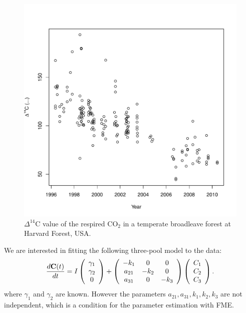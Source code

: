 \documentclass[a4paper]{article}\usepackage[]{graphicx}\usepackage[]{color}
\makeatletter
\def\maxwidth{ %
  \ifdim\Gin@nat@width>\linewidth
    \linewidth
  \else
    \Gin@nat@width
  \fi
}
\newenvironment{kframe}{%
 \def\at@end@of@kframe{}%
 \ifinner\ifhmode%
  \def\at@end@of@kframe{\end{minipage}}%
  \begin{minipage}{\columnwidth}%
 \fi\fi%
 \def\FrameCommand##1{\hskip\@totalleftmargin \hskip-\fboxsep
 \colorbox{shadecolor}{##1}\hskip-\fboxsep
     \hskip-\linewidth \hskip-\@totalleftmargin \hskip\columnwidth}%
 \MakeFramed {\advance\hsize-\width
   \@totalleftmargin\z@ \linewidth\hsize
   \@setminipage}}%
 {\par\unskip\endMakeFramed%
 \at@end@of@kframe}
\newenvironment{knitrout}{}{} %
\makeatother
\begin{document}
\begin{figure}
\begin{knitrout}
\begin{kframe}
{\ttfamily\noindent\color{warningcolor}{\#\# Warning in title(...): conversion failure on '(‰)' in 'mbcsToSbcs': dot substituted for <b0>}}\end{kframe}
\includegraphics[width=\maxwidth]{figure/unnamed-chunk-16-1} 

\end{knitrout}
  \caption{$\Delta^{14}$C value of the respired CO$_2$ in a temperate broadleave forest at Harvard Forest, USA.}
  \label{fig:radiocarbondata}
\end{figure}

We are interested in fitting the following three-pool model to the data: 
\begin{equation} \label{eq:HarvardForestModel}
\frac{d {\bf C}(t)}{dt} = I \left( \begin{array}{c} \gamma_1 \\ \gamma_2 \\ 0 \end{array} \right) +
\left( \begin{array}{ccc}
-k_1 & 0 & 0 \\
a_{21} & -k_2 & 0 \\
a_{31} & 0 & -k_3
\end{array} \right)
\left( \begin{array}{c} C_1 \\ C_2 \\ C_3 \end{array} \right).
\end{equation}
where $\gamma_1$ and $\gamma_2$ are known. 
However the parameters $a_{21},a_{31},k_1,k_2,k_3 $ are not independent, which is a condition for the parameter estimation with FME.
\end{document}
